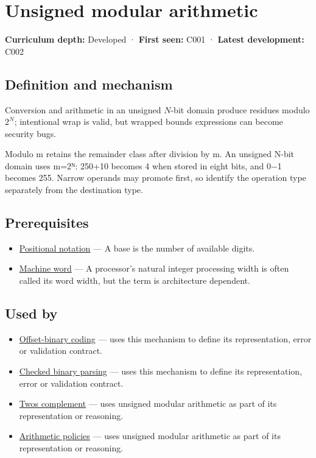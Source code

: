 \hypertarget{appendix-c99977d88b33}{}
\section{Unsigned modular arithmetic}\label{appendix-c99977d88b33-unsigned-modular-arithmetic}

\textbf{Curriculum depth:} Developed · \textbf{First seen:} C001 · \textbf{Latest development:} C002

\subsection{Definition and mechanism}\label{appendix-c99977d88b33-definition-and-mechanism}

Conversion and arithmetic in an unsigned \(N\)-bit domain produce residues modulo \(2^N\); intentional wrap is valid, but wrapped bounds expressions can become security bugs.

Modulo m retains the remainder class after division by m. An unsigned N-bit domain uses m=2ᴺ: 250+10 becomes 4 when stored in eight bits, and 0−1 becomes 255. Narrow operands may promote first, so identify the operation type separately from the destination type.

\subsection{Prerequisites}\label{appendix-c99977d88b33-prerequisites}

\begin{itemize}
\tightlist
\item
  \hyperref[appendix-83c3f28f7bda]{Positional notation} --- A base is the number of available digits.
\item
  \hyperref[appendix-d67a19507dc5]{Machine word} --- A processor's natural integer processing width is often called its word width, but the term is architecture dependent.
\end{itemize}

\subsection{Used by}\label{appendix-c99977d88b33-used-by}

\begin{itemize}
\item
  \hyperref[appendix-53a8cfb25f8d]{Offset-binary coding} --- uses this mechanism to define its representation, error or validation contract.
\item
  \hyperref[appendix-652d81568de9]{Checked binary parsing} --- uses this mechanism to define its representation, error or validation contract.
\item
  \hyperref[appendix-4fbc03d20829]{Two\textquotesingle s complement} --- uses unsigned modular arithmetic as part of its representation or reasoning.
\item
  \hyperref[appendix-2ed044358b82]{Arithmetic policies} --- uses unsigned modular arithmetic as part of its representation or reasoning.
\end{itemize}

